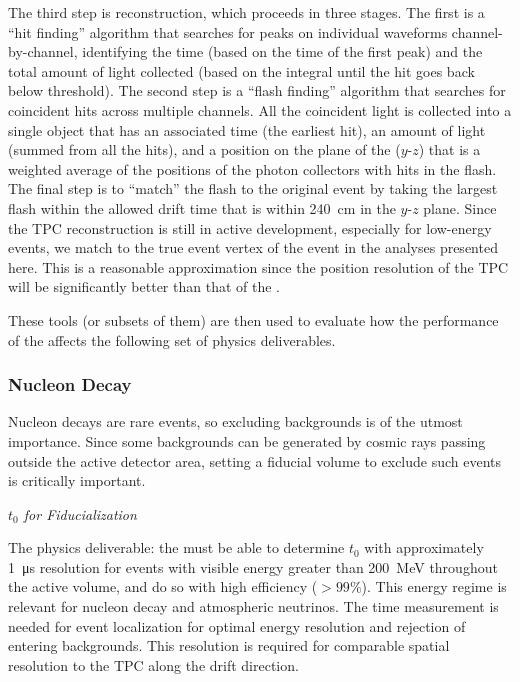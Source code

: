 The third step is reconstruction, which proceeds in three stages. The first is a ``hit finding'' algorithm that searches for peaks on individual waveforms channel-by-channel, identifying the time (based on the time of the first peak) and the total amount of light collected (based on the integral until the hit goes back below threshold). The second step is a ``flash finding'' algorithm that searches for coincident hits across multiple channels. All the coincident light is collected into a single object that has an associated time (the earliest hit), an amount of light (summed from all the hits), and a position on the plane of the  ($y$-$z$) that is a weighted average of the positions of the photon collectors with hits in the flash. %
The final step is to ``match'' the flash to the original event by taking the largest flash within the allowed drift time that is within \SI{240}{cm} in the $y$-$z$ plane. Since the TPC reconstruction is still in active development, especially for low-energy events, we match to the true event %
vertex of the event in the analyses presented here. This is a reasonable approximation since the position resolution of the TPC will be significantly better than that of the . 

These tools (or subsets of them) are then used to evaluate how the performance of the  affects the following set of physics deliverables.

\subsubsection{Nucleon Decay}

Nucleon decays are rare events, so excluding backgrounds is of the utmost importance. Since some backgrounds can be generated by cosmic rays passing outside the active detector area, setting a fiducial volume to exclude such events is critically important.

\textit{$t_0$ for Fiducialization}

The physics deliverable: the  must be able to determine $t_0$ with approximately \SI{1}{\micro s} resolution for events with visible energy greater than \SI{200}{MeV} throughout the active volume, and do so with high efficiency ($>99\%$). This energy regime is relevant for nucleon decay and atmospheric neutrinos. The time measurement is needed for event localization for optimal energy resolution and rejection of entering backgrounds. 
This %
resolution is required for comparable spatial resolution to the TPC along the drift direction.

